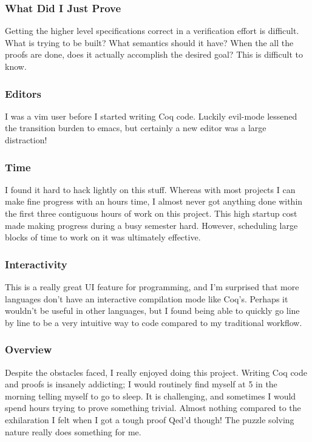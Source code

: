 \documentclass[preprint,12pt]{sigplanconf}
\begin{document}
\subsubsection{What Did I Just Prove}
Getting the higher level specifications correct in a verification effort is
difficult. What is trying to be built? What semantics should it have?
When the all the proofs are done, does it actually accomplish the
desired goal? This is difficult to know.

\subsubsection{Editors}
I was a vim user before I started writing Coq code. Luckily evil-mode
lessened the transition burden to emacs, but certainly a new editor
was a large distraction!

\subsubsection{Time}
I found it hard to hack lightly on this stuff. Whereas with most
projects I can make fine progress with an hours time, I almost never
got anything done within the first three contiguous hours of work on
this project. This high startup cost made making progress during a
busy semester hard. However, scheduling large blocks of time to work
on it was ultimately effective.

\subsubsection{Interactivity}
This is a really great UI feature for programming, and I'm surprised
that more languages don't have an interactive compilation mode like
Coq's. Perhaps it wouldn't be useful in other languages, but I found
being able to quickly go line by line to be a very intuitive way to
code compared to my traditional workflow. 

\subsubsection{Overview}
Despite the obstacles faced, I really enjoyed doing this
project. Writing Coq code and proofs is insanely addicting; I would
routinely find myself at 5 in the morning telling myself to go to
sleep. It is challenging, and sometimes I would spend hours trying to
prove something trivial. Almost nothing compared to the exhilaration
I felt when I got a tough proof Qed'd though! The puzzle solving
nature really does something for me. 
\end{document}
